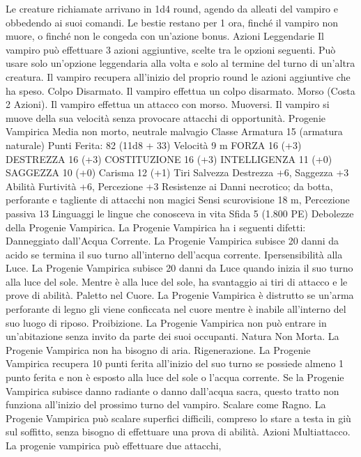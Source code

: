 \begin{multicols}{2}
Le creature richiamate arrivano in 1d4 round, agendo da alleati
del vampiro e obbedendo ai suoi comandi. Le bestie restano per
1 ora, finché il vampiro non muore, o finché non le congeda con
un’azione bonus.
Azioni Leggendarie
Il vampiro può effettuare 3 azioni aggiuntive, scelte tra le
opzioni seguenti. Può usare solo un’opzione leggendaria alla
volta e solo al termine del turno di un’altra creatura. Il vampiro
recupera all’inizio del proprio round le azioni aggiuntive che ha
speso.
Colpo Disarmato. Il vampiro effettua un colpo disarmato.
Morso (Costa 2 Azioni). Il vampiro effettua un attacco con
morso.
Muoversi. Il vampiro si muove della sua velocità senza
provocare attacchi di opportunità.
Progenie Vampirica
Media non morto, neutrale malvagio
Classe Armatura 15 (armatura naturale)
\hspace*{0pt}\hfill{Punti Ferita}: 82 (11d8 + 33)
Velocità 9 m
FORZA 16 (+3)
DESTREZZA 16 (+3)
COSTITUZIONE 16 (+3)
INTELLIGENZA 11 (+0)
SAGGEZZA 10 (+0)
Carisma 12 (+1)
Tiri Salvezza Destrezza +6, Saggezza +3
Abilità Furtività +6, Percezione +3
Resistenze ai Danni necrotico; da botta, perforante e
tagliente di attacchi non magici
Sensi scurovisione 18 m, Percezione passiva 13
Linguaggi le lingue che conosceva in vita
Sfida 5 (1.800 PE)
Debolezze della Progenie Vampirica. La Progenie Vampirica ha
i seguenti difetti:
Danneggiato dall’Acqua Corrente. La Progenie Vampirica
subisce 20 danni da acido se termina il suo turno all’interno
dell’acqua corrente.
Ipersensibilità alla Luce. La Progenie Vampirica subisce 20
danni da Luce quando inizia il suo turno alla luce del sole.
Mentre è alla luce del sole, ha svantaggio ai tiri di attacco e le
prove di abilità.
Paletto nel Cuore. La Progenie Vampirica è distrutto se un’arma
perforante di legno gli viene conficcata nel cuore mentre è
inabile all’interno del suo luogo di riposo.
Proibizione. La Progenie Vampirica non può entrare in
un’abitazione senza invito da parte dei suoi occupanti.
Natura Non Morta. La Progenie Vampirica non ha bisogno di
aria.
Rigenerazione. La Progenie Vampirica recupera 10 punti ferita
all’inizio del suo turno se possiede almeno 1 punto ferita e non è
esposto alla luce del sole o l’acqua corrente. Se la Progenie
Vampirica subisce danno radiante o danno dall’acqua sacra,
questo tratto non funziona all’inizio del prossimo turno del
vampiro.
Scalare come Ragno. La Progenie Vampirica può scalare
superfici difficili, compreso lo stare a testa in giù sul soffitto,
senza bisogno di effettuare una prova di abilità.
Azioni
Multiattacco. La progenie vampirica può effettuare due attacchi,

\end{multicols}
